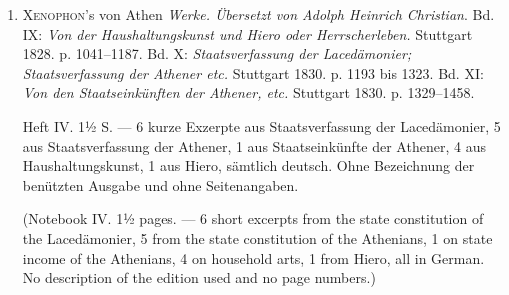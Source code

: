 \begin{enumerate}
    (Reproduced in .)
    
    Heft III. 11 S. --- 73 kurze und mittlere Exzerpte, teils französisch, teils deutsch; hiervon: 30 Stücke aus T. II, von Beginn des livre III bis Bandschluß; 43 Stücke aus T. III, den ganzen Band umfassend (mit größeren Lücken). --- Von Marx: kleine Zwischenbemerkung.
    
    (Notebook III. 11 pages. --- 73 short and medium excerpts, some in French, some in German; of these: 30 from T. II, from the beginning of livre III to the end of the volume; 43 from T. III, across the whole volume (with large gaps). --- From Marx: small interim remark.)
    
    (Reproduced in .)
    
    \item \textsc{Xenophon}'s von Athen \textit{Werke. Übersetzt von Adolph Heinrich Christian}. Bd. IX: \textit{Von der Haushaltungskunst und Hiero oder Herrscherleben.} Stuttgart 1828. p. 1041--1187. Bd. X: \textit{Staatsverfassung der Lacedämonier; Staatsverfassung der Athener etc.} Stuttgart 1830. p. 1193 bis 1323. Bd. XI: \textit{Von den Staatseinkünften der Athener, etc.} Stuttgart 1830. p. 1329--1458.
    
    Heft IV. 1½ S. --- 6 kurze Exzerpte aus Staatsverfassung der Lacedämonier, 5 aus Staatsverfassung der Athener, 1 aus Staatseinkünfte der Athener, 4 aus Haushaltungskunst, 1 aus Hiero, sämtlich deutsch. Ohne Bezeichnung der benützten Ausgabe und ohne Seitenangaben.
    
    (Notebook IV. 1½ pages. --- 6 short excerpts from the state constitution of the Lacedämonier, 5 from the state constitution of the Athenians, 1 on state income of the Athenians, 4 on household arts, 1 from Hiero, all in German. No description of the edition used and no page numbers.)

\end{enumerate}


